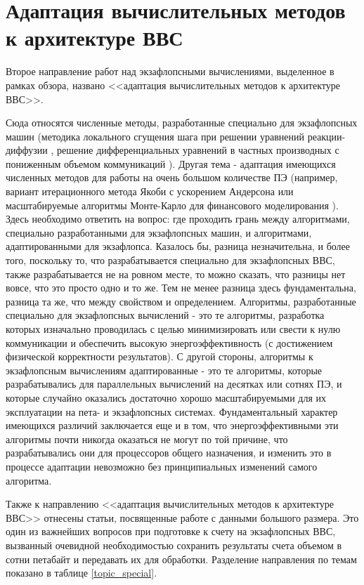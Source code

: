 \section{Адаптация вычислительных методов к архитектуре ВВС}

Второе направление работ над экзафлопсными вычислениями, выделенное в рамках обзора, названо <<адаптация вычислительных методов к архитектуре ВВС>>. 

Сюда относятся численные методы, разработанные специально для экзафлопсных машин (методика локального сгущения шага при решении уравнений реакции-диффузии \cite{Krause2016164}, решение дифференциальных уравнений в частных производных с пониженным объемом коммуникаций \cite{Norman2015}).
Другая тема  - адаптация имеющихся численных методов для работы на очень большом количестве ПЭ (например, вариант итерационного метода Якоби с ускорением Андерсона \cite{Pratapa201643} или масштабируемые алгоритмы Монте-Карло для финансового моделирования \cite{Alexandrov20111708}). Здесь необходимо ответить на вопрос: где проходить грань между алгоритмами, специально разработанными для экзафлопсных машин, и алгоритмами, адаптированными для экзафлопса. Казалось бы, разница незначительна, и более того, поскольку то, что разрабатывается специально для экзафлопсных ВВС, также разрабатывается не на ровном месте, то можно сказать, что разницы нет вовсе, что это просто одно и то же. Тем не менее  разница здесь фундаментальна, разница та же, что между свойством и определением. Алгоритмы, разработанные специально для экзафлопсных вычислений - это те алгоритмы, разработка которых изначально проводилась с целью минимизировать или свести к нулю коммуникации и обеспечить высокую энергоэффективность  (с достижением физической корректности результатов). С другой стороны, алгоритмы к экзафлопсным вычислениям адаптированные -  это те алгоритмы, которые разрабатывались для параллельных вычислений на десятках или сотнях ПЭ, и которые случайно оказались достаточно хорошо масштабируемыми для их эксплуатации на пета- и экзафлопсных системах. Фундаментальный характер имеющихся различий заключается еще и в том, 
что энергоэффективными эти алгоритмы почти никогда оказаться не могут по той причине, что разрабатывались они для процессоров общего назначения, и изменить это в процессе адаптации невозможно без принципиальных изменений самого алгоритма.

Также к направлению <<адаптация вычислительных методов к архитектуре ВВС>> отнесены статьи, посвященные работе с данными большого размера. Это один из важнейших вопросов при подготовке к счету на экзафлопсных ВВС, вызванный очевидной необходимостью сохранить результаты счета объемом в сотни петабайт \cite{Abramson20141} и передавать их для обработки. Разделение направления по темам показано в таблице \ref{topic_special}.	

